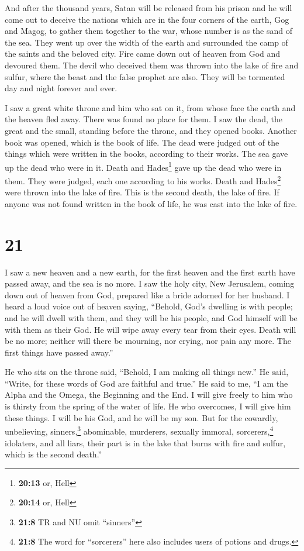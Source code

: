  And after the thousand years, Satan will be released from
his prison  and he will come out to deceive the nations
which are in the four corners of the earth, Gog and Magog, to gather
them together to the war, whose number is as the sand of the sea.
 They went up over the width of the earth and surrounded
the camp of the saints and the beloved city. Fire came down out of
heaven from God and devoured them.  The devil who
deceived them was thrown into the lake of fire and sulfur, where the
beast and the false prophet are also. They will be tormented day and
night forever and ever.

 I saw a great white throne and him who sat on it, from
whose face the earth and the heaven fled away. There was found no place
for them.  I saw the dead, the great and the small,
standing before the throne, and they opened books. Another book was
opened, which is the book of life. The dead were judged out of the
things which were written in the books, according to their works.
 The sea gave up the dead who were in it. Death and
Hades\footnote{\textbf{20:13} or, Hell} gave up the dead who were in
them. They were judged, each one according to his works. 
Death and Hades\footnote{\textbf{20:14} or, Hell} were thrown into the
lake of fire. This is the second death, the lake of fire.
 If anyone was not found written in the book of life, he
was cast into the lake of fire.

\hypertarget{section-20}{%
\section{21}\label{section-20}}

 I saw a new heaven and a new earth, for the first heaven
and the first earth have passed away, and the sea is no more.
 I saw the holy city, New Jerusalem, coming down out of
heaven from God, prepared like a bride adorned for her husband.
 I heard a loud voice out of heaven saying, ``Behold,
God's dwelling is with people; and he will dwell with them, and they
will be his people, and God himself will be with them as their God.
 He will wipe away every tear from their eyes. Death will
be no more; neither will there be mourning, nor crying, nor pain any
more. The first things have passed away.''

 He who sits on the throne said, ``Behold, I am making all
things new.'' He said, ``Write, for these words of God are faithful and
true.''  He said to me, ``I am the Alpha and the Omega,
the Beginning and the End. I will give freely to him who is thirsty from
the spring of the water of life.  He who overcomes, I will
give him these things. I will be his God, and he will be my son.
 But for the cowardly, unbelieving, sinners,\footnote{\textbf{21:8}
  TR and NU omit ``sinners''} abominable, murderers, sexually immoral,
sorcerers,\footnote{\textbf{21:8} The word for ``sorcerers'' here also
  includes users of potions and drugs.} idolaters, and all liars, their
part is in the lake that burns with fire and sulfur, which is the second
death.''

